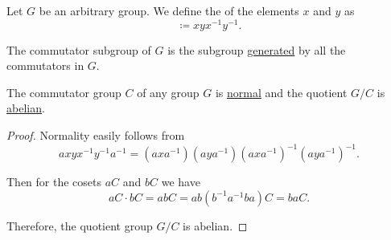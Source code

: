 \begin{definition}\label{def:group_commutator}
  Let \( G \) be an arbitrary group. We define the  of the elements \( x \) and \( y \) as
  \begin{equation*}
    [x, y] \coloneqq xyx^{-1}y^{-1}.
  \end{equation*}

  The commutator subgroup of \( G \) is the subgroup \hyperref[def:first_order_generated_substructure]{generated} by all the commutators in \( G \).
\end{definition}

\begin{proposition}\label{thm:quotient_by_commutator_subgroup}
  The commutator group \( C \) of any group \( G \) is \hyperref[def:normal_subgroup]{normal} and the quotient \( G / C \) is \hyperref[def:abelian_group]{abelian}.
\end{proposition}
\begin{proof}
  Normality easily follows from
  \begin{equation*}
    a xyx^{-1}y^{-1} a^{-1}
    =
    (a x a^{-1}) (a y a^{-1}) (a x a^{-1})^{-1} (a y a^{-1})^{-1}.
  \end{equation*}

  Then for the cosets \( a C \) and \( b C \) we have
  \begin{equation*}
    a C \cdot b C
    =
    a b C
    =
    a b (b^{-1} a^{-1} b a) C
    =
    b a C.
  \end{equation*}

  Therefore, the quotient group \( G / C \) is abelian.
\end{proof}

